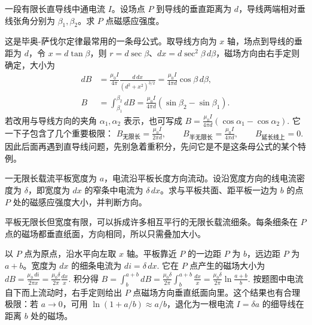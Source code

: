 \documentclass[lang=cn,11pt]{elegantbook}
\begin{document}
\begin{exercise}[有限长直导线的磁场]
一段有限长直导线中通电流 \(I\)。设场点 \(P\) 到导线的垂直距离为 \(d\)，导线两端相对垂线张角分别为 \(\beta_1,\beta_2\)。求 \(P\) 点磁感应强度。
\end{exercise}

\begin{solution}
这是毕奥-萨伐尔定律最常用的一条母公式。取导线方向为 \(x\) 轴，场点到导线的垂距为 \(d\)，令 \(x=d\tan\beta\)，则 \(r=d\sec\beta\)、\(dx=d\sec^2\beta\,d\beta\)，磁场方向由右手定则确定，大小为
\[
\begin{aligned}
dB&=\frac{\mu_0 I}{4\pi}\frac{d\,dx}{(d^2+x^2)^{3/2}}
=\frac{\mu_0 I}{4\pi d}\cos\beta\,d\beta,\\
B&=\int_{\beta_1}^{\beta_2}dB
=\frac{\mu_0I}{4\pi d}\left(\sin\beta_2-\sin\beta_1\right).
\end{aligned}
\]
若改用与导线方向的夹角 \(\alpha_1,\alpha_2\) 表示，也可写成
 \(B=\frac{\mu_0I}{4\pi d}\left(\cos\alpha_1-\cos\alpha_2\right).\) 
它一下子包含了几个重要极限：
 \(B_{\text{无限长}}=\frac{\mu_0I}{2\pi d}, \qquad B_{\text{半无限长}}=\frac{\mu_0I}{4\pi d}, \qquad B_{\text{延长线上}}=0.\) 
因此后面再遇到直导线问题，先别急着重积分，先问它是不是这条母公式的某个特例。
\end{solution}

\begin{exercise}
一无限长载流平板宽度为 \(a\)，电流沿平板长度方向流动。设沿宽度方向的线电流密度为 \(\delta\)，即宽度为 \(dx\) 的窄条中电流为 \(\delta\,dx\)。求与平板共面、距平板一边为 \(b\) 的点 \(P\) 处的磁感应强度大小，并判断方向。
\end{exercise}

\begin{solution}
平板无限长但宽度有限，可以拆成许多相互平行的无限长载流细条。每条细条在 \(P\) 点的磁场都垂直纸面，方向相同，所以只需叠加大小。

以 \(P\) 点为原点，沿水平向左取 \(x\) 轴。平板靠近 \(P\) 的一边距 \(P\) 为 \(b\)，远边距 \(P\) 为 \(a+b\)。宽度为 \(dx\) 的细条电流为
 \(di=\delta\,dx.\) 
它在 \(P\) 点产生的磁场大小为
 \(dB=\frac{\mu_0\,di}{2\pi x} =\frac{\mu_0\delta}{2\pi}\frac{dx}{x}.\) 
积分得
 \(B=\int_b^{a+b}dB =\frac{\mu_0\delta}{2\pi}\int_b^{a+b}\frac{dx}{x} =\boxed{\frac{\mu_0\delta}{2\pi}\ln\frac{a+b}{b}}.\) 
按题图中电流自下而上流动时，右手定则给出 \(P\) 点磁场方向垂直纸面向里。这个结果也有合理极限：若 \(a\to 0\)，可用 \(\ln(1+a/b)\approx a/b\)，退化为一根电流 \(I=\delta a\) 的细导线在距离 \(b\) 处的磁场。
\end{solution}
\end{document}
